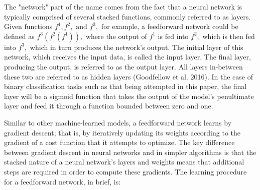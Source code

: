 \documentclass[12pt]{article}  %
\theoremstyle{definition}
\theoremstyle{remark}
\begin{document}
\par The "network" part of the name comes from the fact that a neural network is typically comprised of several stacked functions, commonly referred to as layers. Given functions $f^{1}, f^{2}, \text{ and } f^{3},$ for example, a feedforward network could be defined as $f^{3}(f^{2}(f^{1})),$ where the output of $f^{1}$ is fed into $f^{2},$ which is then fed into $f^{3},$ which in turn produces the network's output. The initial layer of this network, which receives the input data, is called the input layer. The final layer, producing the output, is referred to as the output layer. All layers in-between these two are referred to as hidden layers (Goodfellow et al. 2016). In the case of binary classification tasks such as that being attempted in this paper, the final layer will be a sigmoid function that takes the output of the model's penultimate layer and feed it through a function bounded between zero and one. 

\par Similar to other machine-learned models, a feedforward network learns by gradient descent; that is, by iteratively updating its weights according to the gradient of a cost function that it attempts to optimize. The key difference between gradient descent in neural networks and in simpler algorithms is that the stacked nature of a neural network's layers and weights means that additional steps are required in order to compute these gradients. The learning procedure for a feedforward network, in brief, is: 
\end{document}
